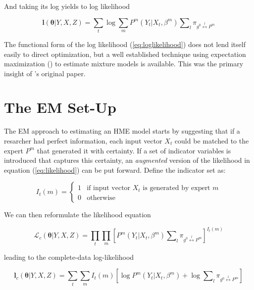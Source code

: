 \documentclass[12pt]{article}
\newcommand{\sumgateprod}[3]{\pi_{#1 \overset{#3}{\longleftrightarrow} #2}}
\newcommand{\shortsum}[1]{\sum \nolimits_{#1}}
\begin{document}
And taking its log yields to log likelihood

\begin{equation} \label{eq:loglikelihood}
  \boldsymbol{l}(\boldsymbol{\theta}|Y, X, Z) = \sum_{t}\log\sum_{m}P^{m}(Y_{t}|X_{t},\beta^{m}) \shortsum{l} \sumgateprod{g^{0}}{P^{m}}{l}
\end{equation}

The functional form of the log likelihood (\ref{eq:loglikelihood}) does not
lend itself easily to direct optimization, but a well established
technique using expectation maximization (\cite{EM_DLR1977}) to estimate mixture
models is available. This was the primary insight of \cite{JordanJacobs1993}'s
original paper.


\section{The EM Set-Up} \label{sec:Estimation}

The EM approach to estimating an HME model starts by suggesting that if a
resarcher had perfect information, each input vector $X_{t}$ could be matched
to the expert $P^{m}$ that generated it with certainty. If a set of indicator
variables is introduced that captures this certainty, an \textit{augmented}
version of the likelihood in equation (\ref{eq:likelihood}) can be put forward.
Define the indicator set as:

\begin{equation} \label{eq:indicator}
  I_{t}(m) = \begin{cases} 
     1 & \textrm{if input vector $X_{t}$ is generated by expert $m$} \\
     0 & \textrm{otherwise}
             \end{cases}
\end{equation}

We can then reformulate the likelihood equation

\begin{equation}  \label{eq:auglikelihood}
  \mathcal{L}_{c}(\boldsymbol{\theta}|Y, X, Z) = \prod_{t} \prod_{m} \left[ P^{m}(Y_{t}|X_{t},\beta^{m}) \shortsum{l} \sumgateprod{g^{0}}{P^{m}}{l} \right]^{I_{t}(m)}
\end{equation}

leading to the complete-data log-likelihood

\begin{equation}  \label{eq:augloglikelihood}
  \boldsymbol{l}_{c}(\boldsymbol{\theta}|Y, X, Z) = \sum_{t} \sum_{m} I_{t}(m) \left[\log P^{m}(Y_{t}|X_{t},\beta^{m}) + \log \shortsum{l} \sumgateprod{g^{0}}{P^{m}}{l} \right]
\end{equation}
\end{document}
